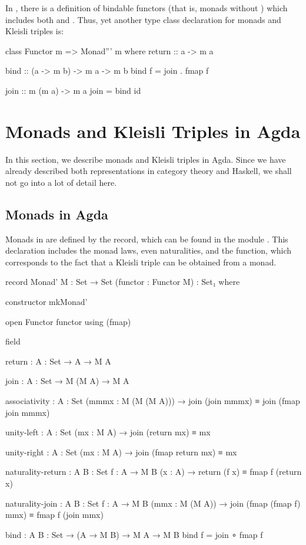 \begin{remark}
  \label{re:monad-bind}

  In \parencite{kmett-2014}, there is a definition of bindable
  functors (that is, monads without ) which
  includes both  and . Thus, yet
  another type class declaration for monads and Kleisli triples is:
  \begin{codehaskell}
class Functor m => Monad''' m where
  return :: a -> m a

  bind :: (a -> m b) -> m a -> m b
  bind f = join . fmap f

  join :: m (m a) -> m a
  join = bind id
  \end{codehaskell}

\end{remark}

\section{Monads and Kleisli Triples in Agda}
\label{sec:monads-agda}

In this section, we describe monads and Kleisli triples in Agda. Since
we have already described both representations in category theory and
Haskell, we shall not go into a lot of detail here.

\subsection{Monads in Agda}

Monads in \agda are defined by the  record, which can
be found in the module . This declaration
includes the monad laws, even naturalities, and the 
function, which corresponds to the fact that a Kleisli triple can be
obtained from a monad.
\begin{codeagda}
record Monad' {M : Set → Set} (functor : Functor M) : Set₁ where

  constructor mkMonad'

  open Functor functor using (fmap)

  field

    return : {A : Set} → A → M A

    join   : {A : Set} → M (M A) → M A

    associativity : {A : Set} (mmmx : M (M (M A))) →
                    join (join mmmx) ≡ join (fmap join mmmx)

    unity-left    : {A : Set} (mx : M A) → join (return mx) ≡ mx

    unity-right   : {A : Set} (mx : M A) → join (fmap return mx) ≡ mx

    naturality-return : {A B : Set} {f : A → M B} (x : A) →
                        return (f x) ≡ fmap f (return x)

    naturality-join   : {A B : Set} {f : A → M B} (mmx : M (M A)) →
                        join (fmap (fmap f) mmx) ≡ fmap f (join mmx)

  bind : {A B : Set} → (A → M B) → M A → M B
  bind f = join ∘ fmap f
\end{codeagda}

